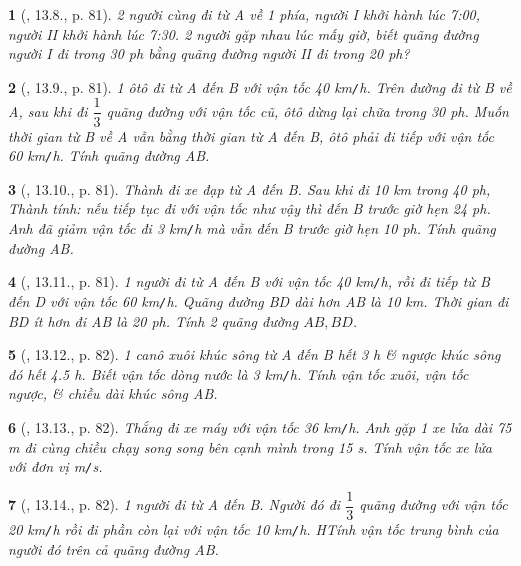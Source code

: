 \documentclass{article}
\newtheorem{baitoan}{}
\begin{document}
\begin{baitoan}[\cite{TLCT_THCS_Toan_6_so_hoc}, 13.8., p. 81]
	2 người cùng đi từ A về 1 phía, người I khởi hành lúc {\rm7:00}, người II khởi hành lúc {\rm7:30}. 2 người gặp nhau lúc mấy giờ, biết quãng đường người I đi trong {\rm30 ph} bằng quãng đường người II đi trong {\rm20 ph}?
\end{baitoan}

\begin{baitoan}[\cite{TLCT_THCS_Toan_6_so_hoc}, 13.9., p. 81]
	1 ôtô đi từ A đến B với vận tốc {\rm40 km{\tt/}h}. Trên đường đi từ B về A, sau khi đi $\dfrac{1}{3}$ quãng đường với vận tốc cũ, ôtô dừng lại chữa trong {\rm30 ph}. Muốn thời gian từ B về A vẫn bằng thời gian từ A đến B, ôtô phải đi tiếp với vận tốc {\rm60 km{\tt/}h}. Tính quãng đường AB.
\end{baitoan}

\begin{baitoan}[\cite{TLCT_THCS_Toan_6_so_hoc}, 13.10., p. 81]
	Thành đi xe đạp từ A đến B. Sau khi đi {\rm10 km} trong {\rm40 ph}, Thành tính: nếu tiếp tục đi với vận tốc như vậy thì đến B trước giờ hẹn {\rm24 ph}. Anh đã giảm vận tốc đi {\rm3 km{\tt/}h} mà vẫn đến B trước giờ hẹn {\rm10 ph}. Tính quãng đường AB.
\end{baitoan}

\begin{baitoan}[\cite{TLCT_THCS_Toan_6_so_hoc}, 13.11., p. 81]
	1 người đi từ A đến B với vận tốc {\rm40 km{\tt/}h}, rồi đi tiếp từ B đến D với vận tốc {\rm60 km{\tt/}h}. Quãng đường BD dài hơn AB là {\rm10 km}. Thời gian đi BD ít hơn đi AB là {\rm20 ph}. Tính 2 quãng đường $AB,BD$.
\end{baitoan}

\begin{baitoan}[\cite{TLCT_THCS_Toan_6_so_hoc}, 13.12., p. 82]
	1 canô xuôi khúc sông từ A đến B hết {\rm3 h} \& ngược khúc sông đó hết {\rm4.5 h}. Biết vận tốc dòng nước là {\rm3 km{\tt/}h}. Tính vận tốc xuôi, vận tốc ngược, \& chiều dài khúc sông AB.
\end{baitoan}

\begin{baitoan}[\cite{TLCT_THCS_Toan_6_so_hoc}, 13.13., p. 82]
	Thắng đi xe máy với vận tốc {\rm36 km{\tt/}h}. Anh gặp 1 xe lửa dài {\rm75 m} đi cùng chiều chạy song song bên cạnh mình trong {\rm15 s}. Tính vận tốc xe lửa với đơn vị {\rm m{\tt/}s}.
\end{baitoan}

\begin{baitoan}[\cite{TLCT_THCS_Toan_6_so_hoc}, 13.14., p. 82]
	1 người đi từ A đến B. Người đó đi $\dfrac{1}{3}$ quãng đường với vận tốc {\rm20 km{\tt/}h} rồi đi phần còn lại với vận tốc {\rm10 km{\tt/}h}. HTính vận tốc trung bình của người đó trên cả quãng đường AB.
\end{baitoan}
\end{document}
